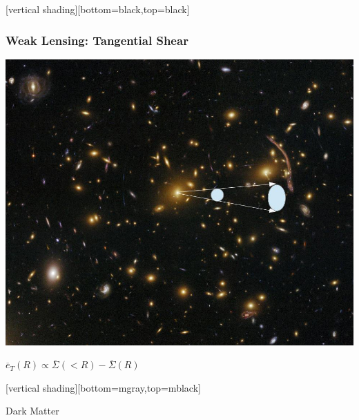 \documentclass{beamer}
\begin{document}
{
    [vertical shading][bottom=black,top=black]
	
    \frame
    {
        \frametitle{Weak Lensing: Tangential Shear}
            
            \begin{minipage}{\linewidth}
                \begin{center}
                    \includegraphics[height=0.6\textheight]{shear-illustration-nowhite.jpg}
                \end{center}
            \end{minipage}

            \begin{minipage}{\linewidth}
                \begin{center}
                    {\color{gold}
                        {\huge
                            $\overline{e}_{T}(R) \propto \overline{\Sigma}(<R) - \overline{\Sigma}(R)$
                        }
                    }
                \end{center}
            \end{minipage}

    }


    [vertical shading][bottom=mgray,top=mblack]

}


\frame
{

    {\Huge Dark Matter}

}
\end{document}
